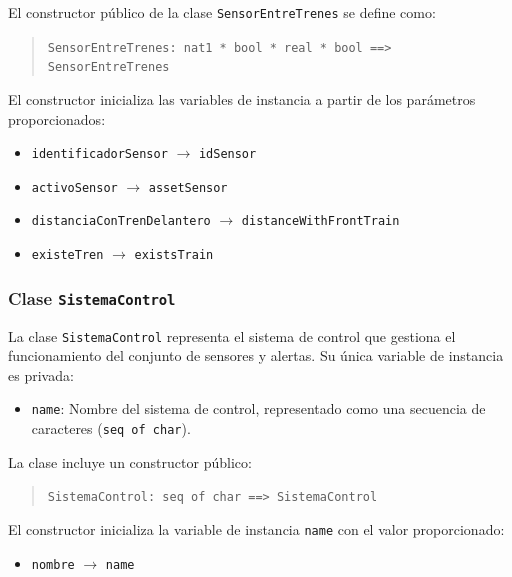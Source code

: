 \documentclass[journal]{IEEEtran}
\begin{document}
    El constructor público de la clase \texttt{SensorEntreTrenes} se define como:

    \begin{quote}
    \texttt{SensorEntreTrenes: nat1 * bool * real * bool \texttt{==>} SensorEntreTrenes}
    \end{quote}

    El constructor inicializa las variables de instancia a partir de los parámetros proporcionados:
    \begin{itemize}
    \item \texttt{identificadorSensor} $\rightarrow$ \texttt{idSensor}
    \item \texttt{activoSensor} $\rightarrow$ \texttt{assetSensor}
    \item \texttt{distanciaConTrenDelantero} $\rightarrow$ \texttt{distanceWithFrontTrain}
    \item \texttt{existeTren} $\rightarrow$ \texttt{existsTrain}
    \end{itemize}




    \subsubsection*{Clase \texttt{SistemaControl}}

    La clase \texttt{SistemaControl} representa el sistema de control que gestiona el funcionamiento del conjunto de sensores y alertas. Su única variable de instancia es privada:

    \begin{itemize}
    \item \texttt{name}: Nombre del sistema de control, representado como una secuencia de caracteres (\texttt{seq of char}).
    \end{itemize}

    La clase incluye un constructor público:

    \begin{quote}
    \texttt{SistemaControl: seq of char \texttt{==>} SistemaControl}
    \end{quote}

    El constructor inicializa la variable de instancia \texttt{name} con el valor proporcionado:

    \begin{itemize}
    \item \texttt{nombre} $\rightarrow$ \texttt{name}
    \end{itemize}
\end{document}
